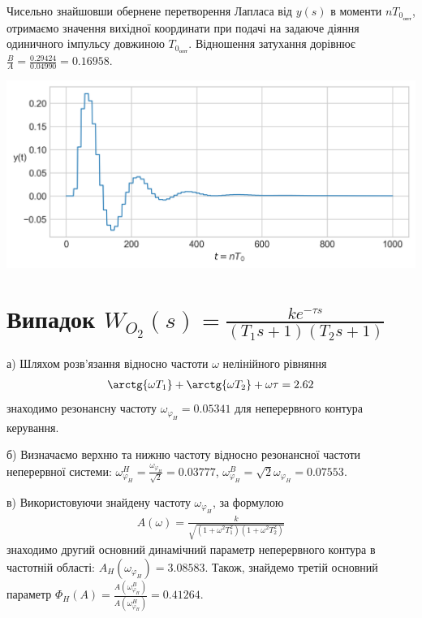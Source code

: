 Чисельно знайшовши обернене перетворення Лапласа від $y(s)$ в моменти $n T_{0_{\text{опт}}}$, 
отримаємо значення вихідної координати при подачі на задаюче діяння одиничного імпульсу довжиною $T_{0_{\text{опт}}}$. 
Відношення затухання дорівнює $\frac{B}{A} = \frac{0.29424}{0.04990} = 0.16958$.
\begin{center}
    \includegraphics[scale=0.9]{pics/transient_process_task_5_1.png}
\end{center}

\section{Випадок \texorpdfstring{$W_{O_2}(s) = \frac{k e^{-\tau s}}{(T_1 s + 1)(T_2 s + 1)}$}{2}}
\label{sec:resonance_2nd_order}
а)\;  Шляхом розв'язання відносно частоти $\omega$ нелінійного рівняння
\begin{gather}
    \arctg{\omega T_1} + \arctg{\omega T_2} + \omega \tau = 2.62
\end{gather}
знаходимо резонансну частоту $\omega_{\varphi_H} = 0.05341$ для неперервного контура керування.

б)\;  Визначаємо верхню та нижню частоту відносно резонансної частоти неперервної системи:
$\omega_{\varphi_H}^H = \frac{\omega_{\varphi_H}}{\sqrt{2}} = 0.03777$, 
$\omega_{\varphi_H}^B = {\sqrt{2}}{\omega_{\varphi_H}} = 0.07553$.

в)\; Використовуючи знайдену частоту $\omega_{\varphi_H}$, за формулою
\begin{gather}
    A(\omega) = \frac{k}{\sqrt{\left(1+\omega^2 T_1^2\right)\left(1+\omega^2 T_2^2\right)}}
\end{gather}
знаходимо другий основний динамічний параметр неперервного контура в частотній області:
$A_H\left(\omega_{\varphi_H}\right) = 3.08583$. Також, знайдемо третій основний параметр
$\Phi_H(A) = \frac{A\left(\omega_{\varphi_H}^B\right)}{A\left(\omega_{\varphi_H}^H\right)} = 0.41264$.

